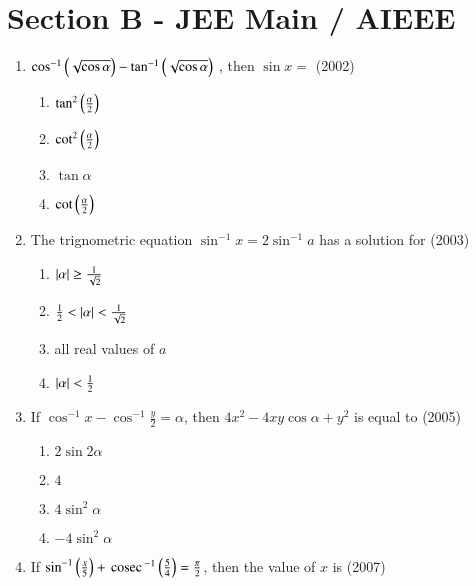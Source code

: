 \documentclass[journal]{IEEEtran}
\begin{document}
\section*{Section B - JEE Main / AIEEE}
\begin{enumerate}
	\item{
			$\cos^{-1}\left(\sqrt{\cos\alpha}\right)-\tan^{-1}\left(\sqrt{\cos\alpha}\right)$ , then $\sin x =$ \hfill (2002)
		\begin{multicols}{4}
		\begin{enumerate}
			\item{$\tan^2 \left(\frac{\alpha}{2}\right)$}
			\columnbreak
			\item{$\cot^2 \left(\frac{\alpha}{2}\right)$}
			\columnbreak
			\item{$\tan\alpha$}
			\columnbreak
			\item{$\cot \left(\frac{\alpha}{2}\right)$}
		\end{enumerate}
		\end{multicols}
	}
	\item{
			The trignometric equation $\sin^{-1} x = 2 \sin^{-1}a$ has a solution for \hfill (2003)
		\begin{multicols}{2}
		\begin{enumerate}
			\item{$\left\vert\alpha\right\vert\geq\frac{1}{\sqrt{2}}$}
			\item{$\frac{1}{2} < \left\vert\alpha\right\vert < \frac{1}{\sqrt{2}}$}
			\columnbreak
			\item{all real values of $a$}
			\item{$\left\vert\alpha\right\vert < \frac{1}{2}$}
		\end{enumerate}
		\end{multicols}
	}
	\item{
			If $\cos^{-1}x - \cos^{-1}\frac{y}{2} = \alpha$, then $4x^2 - 4xy \cos \alpha + y^2$ is equal to \hfill (2005)
		\begin{multicols}{4}
		\begin{enumerate}
			\item{$2 \sin 2\alpha$}
			\columnbreak
			\item{$4$}
			\columnbreak
			\item{$4 \sin^2 \alpha$}
			\columnbreak
			\item{$-4 \sin^2 \alpha$}
		\end{enumerate}
		\end{multicols}
	}
	\item{
			If $\sin^{-1} \left(\frac{x}{5}\right) + \,\text{cosec}\,^{-1}\left(\frac{5}{4}\right) = \frac{\pi}{2}$, then the value of $x$ is \hfill (2007)
}
\end{enumerate}
\end{document}
